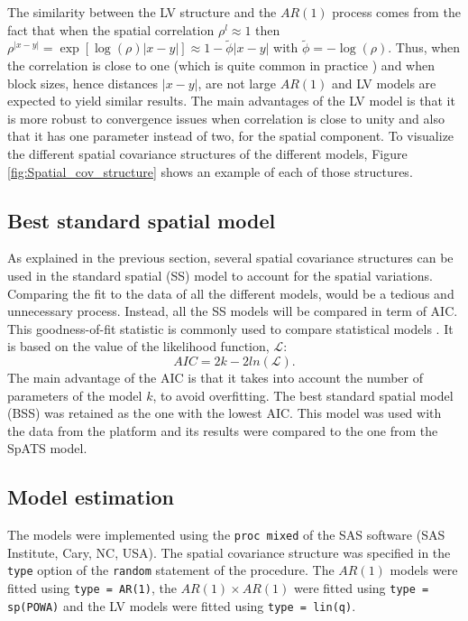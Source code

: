 The similarity between the LV structure and the $AR(1)$ process comes from the fact that when the spatial correlation $\rho^{l} \approx 1$ then 
$\rho^{\left| x-y \right|}=\exp \left[\log (\rho)\left| x-y \right|\right] \approx 1-\tilde{\phi}\left| x -y \right|$ with 
$\tilde{\phi} = -\log(\rho)$. 
Thus, when the correlation is close to one (which is quite common in practice \parencite{pilarczyk2007extent}) and when block sizes, hence distances $\left| x-y \right|$, are not large $AR(1)$ and LV models are expected to yield similar results. The main advantages of the LV model is that it is more robust to convergence issues when correlation is close to unity and also that it has one parameter instead of two, for the spatial component. To visualize the different spatial covariance structures of the different models, Figure \ref{fig:Spatial_cov_structure} shows an example of each of those structures. 



\subsection{Best standard spatial model}
As explained in the previous section, several spatial covariance structures can be used in the standard spatial (SS) model to account for the spatial variations. Comparing the fit to the data of all the different models, would be a tedious and unnecessary process. Instead, all the SS models will be compared in term of AIC. This goodness-of-fit statistic is commonly used to compare statistical models \parencite{piepho_linear_2010,gilmour_accounting_1997,velazco_modelling_2017}. It is based on the value of the likelihood function, $\mathcal{L}$:
\begin{equation}
	AIC = 2k - 2ln(\mathcal{L})
	\text{.}
\end{equation}
The main advantage of the AIC is that it takes into account the number of parameters of the model $k$, to avoid overfitting. The best standard spatial model (BSS) was retained as the one with the lowest AIC. This model was used with the data from the platform and its results were compared to the one from the SpATS model.

\subsection{Model estimation}
The models were implemented using the \verb|proc mixed| of the SAS software (SAS Institute, Cary, NC, USA). The spatial covariance structure was specified in the \verb|type| option of the \verb|random| statement of the procedure. The $AR(1)$ models were fitted using \verb|type = AR(1)|, the $AR(1)\times AR(1)$ were fitted using \verb|type = sp(POWA)| and the LV models were fitted using \verb|type = lin(q)|.

